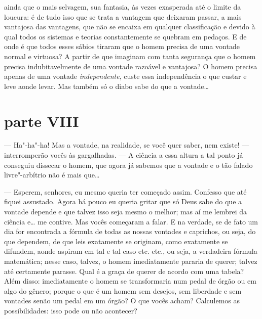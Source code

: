 ainda que o mais selvagem, sua fantasia, às vezes exasperada até o limite da
loucura: é de tudo isso que se trata a vantagem que deixaram passar, a mais
vantajosa das vantagens, que não se encaixa em qualquer classificação e devido
à qual todos os sistemas e teorias constantemente se quebram em pedaços. E de
onde é que todos esses sábios tiraram que o homem precisa de uma vontade normal
e virtuosa? A partir de que imaginam com tanta segurança que o homem precisa
indubitavelmente de uma vontade razoável e vantajosa? O homem precisa apenas de
uma vontade \textit{independente}, custe essa independência o que custar e leve
aonde levar. Mas também só o diabo sabe do que a vontade\ldots{}


\section{parte VIII}

--- Ha"-ha"-ha! Mas a vontade, na realidade, se você quer saber, nem existe!
--- interromperão vocês às gargalhadas. --- A ciência a essa altura a tal
ponto já conseguiu dissecar o homem, que agora já sabemos que a vontade
e o tão falado livre{}"-arbítrio não é mais que\ldots{}

--- Esperem, senhores, eu mesmo queria ter começado assim. Confesso que
até fiquei assustado. Agora há pouco eu queria gritar que só Deus sabe
do que a vontade depende e que talvez isso seja mesmo o melhor; mas aí
me lembrei da ciência e\ldots{} me contive. Mas vocês começaram a falar. E
na verdade, se de fato um dia for encontrada a fórmula de todas as
nossas vontades e caprichos, ou seja, do que dependem, de que leis
exatamente se originam, como exatamente se difundem, aonde aspiram em
tal e tal caso etc. etc., ou seja, a verdadeira fórmula matemática;
nesse caso, talvez, o homem imediatamente pararia de querer; talvez até
certamente parasse. Qual é a graça de querer de acordo com uma tabela?
Além disso: imediatamente o homem se transformaria num pedal de órgão
ou em algo do gênero; porque o que é um homem sem desejos, sem
liberdade e sem vontades senão um pedal em um órgão? O que vocês
acham? Calculemos as possibilidades: isso pode ou não acontecer?

